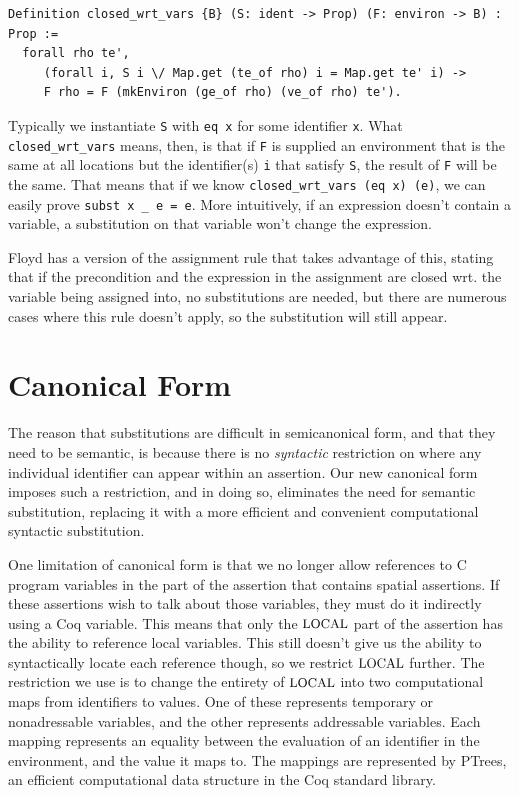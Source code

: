 \documentclass{puthesis}
\begin{document}
\begin{verbatim}
Definition closed_wrt_vars {B} (S: ident -> Prop) (F: environ -> B) : Prop := 
  forall rho te',  
     (forall i, S i \/ Map.get (te_of rho) i = Map.get te' i) ->
     F rho = F (mkEnviron (ge_of rho) (ve_of rho) te').
\end{verbatim}

Typically we instantiate \lstinline|S| with \lstinline|eq x| for some
identifier \lstinline|x|.  What \lstinline|closed_wrt_vars| means, then, is that if
\lstinline|F| is supplied an environment that is the same at all
locations but the identifier(s) \lstinline|i| that satisfy
\lstinline|S|, the result of \lstinline|F| will be the same. That
means that if we know \lstinline|closed_wrt_vars (eq x) (e)|, we can
easily prove \lstinline|subst x _ e = e|. More intuitively, if an
expression doesn't contain a variable, a substitution on that variable
won't change the expression.

Floyd has a version of the assignment rule that takes advantage of
this, stating that if the precondition and the expression in the
assignment are closed wrt. the variable being assigned into, no
substitutions are needed, but there are numerous cases where this rule
doesn't apply, so the substitution will still appear.

\section{Canonical Form}
\label{sec:cform}
The reason that substitutions are difficult in semicanonical form, and
that they need to be semantic, is because there is no \emph{syntactic}
restriction on where any individual identifier can appear within an
assertion. Our new canonical form imposes such a restriction, and in doing
so, eliminates the need for semantic substitution, replacing it with a
more efficient and convenient computational syntactic substitution.

One limitation of canonical form is that we no longer allow references
to C program variables in the part of the assertion that contains
spatial assertions. If these assertions wish to talk about those
variables, they must do it indirectly using a Coq variable.  This
means that only the $\mbox{\small LOCAL}$ part of the assertion has the ability to
reference local variables. This still doesn't give us the ability to
syntactically locate each reference though, so we restrict $\mbox{\small LOCAL}$
further. The restriction we use is to change the entirety of $\mbox{\small LOCAL}$
into two computational maps from identifiers to values.  One of these
represents temporary or nonadressable variables, and the other
represents addressable variables. Each mapping represents an equality
between the evaluation of an identifier in the environment, and the
value it maps to. The mappings are represented by PTrees, an efficient
computational data structure in the Coq standard library.
\end{document}
